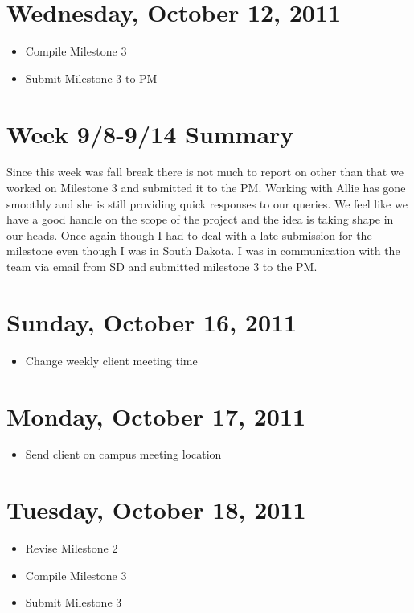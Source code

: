 \documentclass{article}
\begin{document}
\section{Wednesday, October 12, 2011}
\begin{itemize}
\item Compile Milestone 3
\item Submit Milestone 3 to PM
\end{itemize}

\section*{Week 9/8-9/14 Summary}
Since this week was fall break there is not much to report on other than that we worked on Milestone 3 and submitted it to the PM. Working with Allie has gone smoothly and she is still providing quick responses to our queries. We feel like we have a good handle on the scope of the project and the idea is taking shape in our heads. Once again though I had to deal with a late submission for the milestone even though I was in South Dakota. I was in communication with the team via email from SD and submitted milestone 3 to the PM.

\section{Sunday, October 16, 2011}
\begin{itemize}
\item Change weekly client meeting time
\end{itemize}

\section{Monday, October 17, 2011}
\begin{itemize}
\item Send client on campus meeting location
\end{itemize}

\section{Tuesday, October 18, 2011}
\begin{itemize}
\item Revise Milestone 2
\item Compile Milestone 3
\item Submit Milestone 3
\end{itemize}
\end{document}
